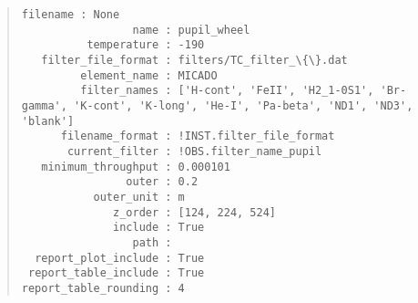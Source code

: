 \begin{quote}
\begin{alltt}
\begin{lstlisting}[frame=single]
             filename : None
                 name : pupil_wheel
          temperature : -190
   filter_file_format : filters/TC_filter_\{\}.dat
         element_name : MICADO
         filter_names : ['H-cont', 'FeII', 'H2_1-0S1', 'Br-gamma', 'K-cont', 'K-long', 'He-I', 'Pa-beta', 'ND1', 'ND3', 'blank']
      filename_format : !INST.filter_file_format
       current_filter : !OBS.filter_name_pupil
   minimum_throughput : 0.000101
                outer : 0.2
           outer_unit : m
              z_order : [124, 224, 524]
              include : True
                 path :
  report_plot_include : True
 report_table_include : True
report_table_rounding : 4
\end{lstlisting}
\end{alltt}
\end{quote}

